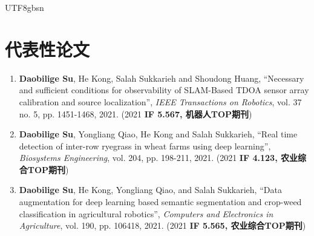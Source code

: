 \documentclass[margin,line]{res}
\begin{document}
\begin{CJK*}{UTF8}{gbsn}
\begin{resume}
\begin{itemize}
\end{itemize}






\section{\sc 代表性论文}
%
%

\begin{enumerate}
\item \textbf{Daobilige Su}, He Kong, Salah Sukkarieh and Shoudong Huang, ``Necessary and sufficient conditions for observability of SLAM-Based TDOA sensor array calibration and source localization'', {\it IEEE Transactions on Robotics}, vol. 37 no. 5, pp. 1451-1468, 2021. (2021 \textbf{IF 5.567, 机器人TOP期刊})

\item \textbf{Daobilige Su}, Yongliang Qiao, He Kong and Salah Sukkarieh, ``Real time detection of inter-row ryegrass in wheat farms using deep learning'', {\it Biosystems Engineering}, vol. 204, pp. 198-211, 2021. (2021 \textbf{IF 4.123, 农业综合TOP期刊})

\item \textbf{Daobilige Su}, He Kong, Yongliang Qiao, and Salah Sukkarieh, ``Data augmentation for deep learning based semantic segmentation and crop-weed classification in agricultural robotics'', {\it Computers and Electronics in Agriculture}, vol. 190, pp. 106418, 2021. (2021 \textbf{IF 5.565, 农业综合TOP期刊})


\end{enumerate}
\end{resume}
\end{CJK*}
\end{document}
